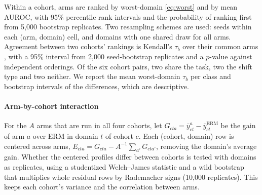 Within a cohort, arms are ranked by worst-domain \eqref{eq:worst} and by mean
AUROC, with 95\% percentile rank intervals and the probability of ranking first
from 5,000 bootstrap replicates. Two resampling schemes are used: seeds within
each (arm, domain) cell, and domains with one shared draw for all arms.
Agreement between two cohorts' rankings is Kendall's $\tau_b$ over their common
arms \citep{kendall1938}, with a 95\% interval from 2,000 seed-bootstrap
replicates and a $p$-value against independent orderings. Of the six cohort
pairs, two share the task, two the shift type and two neither. We report the
mean worst-domain $\tau_b$ per class and bootstrap intervals of the differences, which are
descriptive.

\paragraph{Arm-by-cohort interaction} For the $A$ arms that are run in all
four cohorts, let $G_{cta}=\bar y^{a}_{ct}-\bar y^{\text{ERM}}_{ct}$ be the
gain of arm $a$ over ERM in domain $t$ of cohort $c$. Each (cohort, domain) row
is centered across arms, $E_{cta}=G_{cta}-A^{-1}\sum_{a'}G_{cta'}$, removing
the domain's average gain. Whether the centered profiles differ between cohorts
is tested with domains as replicates, using a studentized Welch--James statistic
and a wild bootstrap that multiplies whole residual rows by Rademacher signs
(10,000 replicates). This keeps each cohort's variance and the correlation
between arms.

